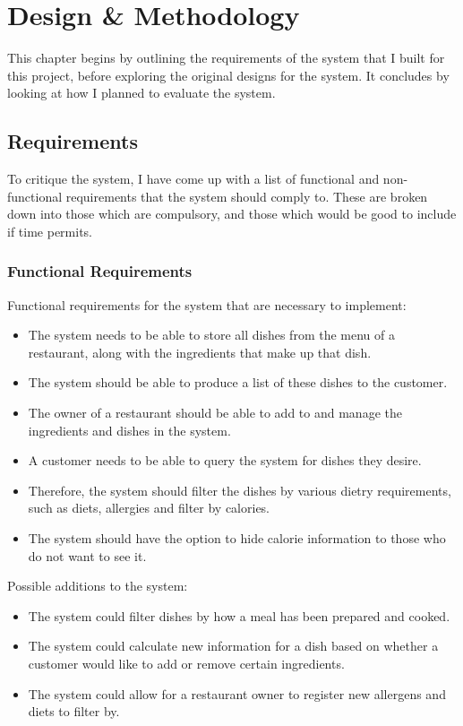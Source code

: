 \chapter{Design \& Methodology}

This chapter begins by outlining the requirements of the system that I built for this project, before exploring the original designs for the system. It concludes by looking at how I planned to evaluate the system.

\section{Requirements}
\label{section:SystemRequirements}

To critique the system, I have come up with a list of functional and non-functional requirements that the system should comply to. These are broken down into those which are compulsory, and those which would be good to include if time permits.

\subsection{Functional Requirements}

Functional requirements for the system that are necessary to implement:

\begin{itemize}
\item The system needs to be able to store all dishes from the menu of a restaurant, along with the ingredients that make up that dish.
\item The system should be able to produce a list of these dishes to the customer.
\item The owner of a restaurant should be able to add to and manage the ingredients and dishes in the system.
\item A customer needs to be able to query the system for dishes they desire.
\item Therefore, the system should filter the dishes by various dietry requirements, such as diets, allergies and filter by calories.
\item The system should have the option to hide calorie information to those who do not want to see it.
\end{itemize}

Possible additions to the system:

\begin{itemize}
\item The system could filter dishes by how a meal has been prepared and cooked.
\item The system could calculate new information for a dish based on whether a customer would like to add or remove certain ingredients.
\item The system could allow for a restaurant owner to register new allergens and diets to filter by.
\end{itemize}

